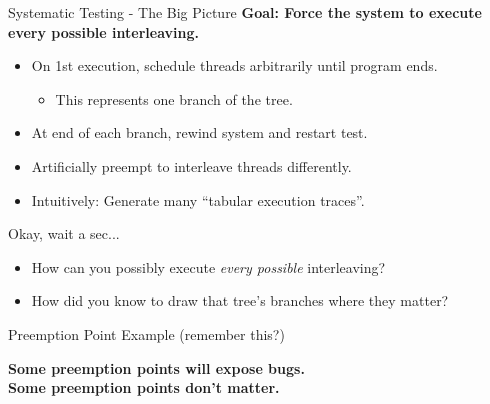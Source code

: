 \documentclass[xcolor=dvipsnames]{beamer}
\begin{document}
\begin{frame}{Systematic Testing - The Big Picture}
	\textbf{Goal: Force the system to execute every possible interleaving.}
	\begin{itemize}
		\item On 1st execution, schedule threads arbitrarily until program ends.
			\begin{itemize}
				\item This represents one branch of the tree.
			\end{itemize}
		\item At end of each branch, rewind system and restart test.
		\item Artificially preempt to interleave threads differently.
		\item Intuitively: Generate many ``tabular execution traces''.
	\end{itemize}
	\pause
	\linegap

	Okay, wait a sec...
	\pause
	\begin{itemize}
		\item How can you possibly execute {\em every possible} interleaving?
		\item How did you know to draw that tree's branches where they matter?
	\end{itemize}
\end{frame}

\begin{frame}{Preemption Point Example (remember this?)}
	\linegap

	{\bf Some preemption points will expose bugs. \\
	Some preemption points don't matter.}

\end{frame}
\end{document}
